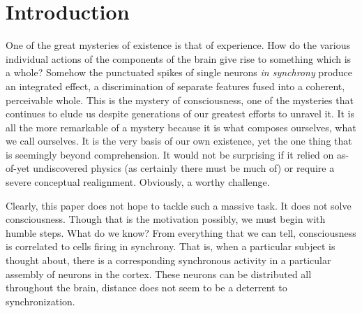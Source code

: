 \documentclass[12pt]{article}
\begin{document}
\maketitle

\section{Introduction}

One of the great mysteries of existence is that of experience.  How do the various individual actions of the components of the brain give rise to something which is a whole?  Somehow the punctuated spikes of single neurons {\em in synchrony} produce an integrated effect, a discrimination of separate features fused into a coherent, perceivable whole.  This is the mystery of consciousness, one of the mysteries that continues to elude us despite generations of our greatest efforts to unravel it.  It is all the more remarkable of a mystery because it is what composes ourselves, what we call ourselves.  It is the very basis of our own existence, yet the one thing that is seemingly beyond comprehension.  It would not be surprising if it relied on as-of-yet undiscovered physics (as certainly there must be much of) or require a severe conceptual realignment.  Obviously, a worthy challenge.

Clearly, this paper does not hope to tackle such a massive task.  It does not solve consciousness.  Though that is the motivation possibly, we must begin with humble steps.  What do we know?  From everything that we can tell, consciousness is correlated to cells firing in synchrony.  That is, when a particular subject is thought about, there is a corresponding synchronous activity in a particular assembly of neurons in the cortex.  These neurons can be distributed all throughout the brain, distance does not seem to be a deterrent to synchronization.  
\end{document}
